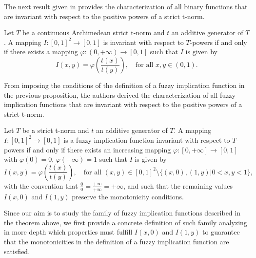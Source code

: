 The next result given in \cite{Massanet2019B} provides the characterization of all binary functions that are invariant with respect to the positive powers of a strict t-norm.
\begin{proposition}\label{prop:strict:charactbintpowerinv}
	Let $T$ be a continuous Archimedean strict t-norm and $t$ an additive generator of $T$. A mapping $I:[0,1]^2 \to [0,1]$ is invariant with respect to $T$-powers if and only if there exists a mapping $\varphi:(0,+\infty) \to [0,1]$ such that $I$ is given by
	$$I(x,y)=\varphi \left(\frac{t(x)}{t(y)}\right), \quad \text{for all } x,y \in (0,1).$$
\end{proposition}
From imposing the conditions of the definition of a fuzzy implication function in the previous proposition, the authors derived the characterization of all fuzzy implication functions that are invariant with respect to the positive powers of a strict t-norm.
\begin{theorem}\label{thm:strict:invimp}
	Let $T$ be a strict t-norm and $t$ an additive generator of $T$. A mapping $I:[0,1]^2 \to [0,1]$ is a fuzzy implication function invariant with respect to $T$-powers if and only if there exists an increasing mapping $\varphi:[0,+\infty] \to [0,1]$ with $\varphi(0)=0$, $\varphi(+\infty)=1$ such that $I$ is given by
	\begin{equation}
		I(x,y)=\varphi \left( \frac{t(x)}{t(y)} \right), \quad \text{for all } (x,y) \in [0,1]^2 \setminus \{(x,0),(1,y) \vert 0<x,y<1\},
		\label{eq:strict:invimpl}
	\end{equation}
	with the convention that $\frac{0}{0}=\frac{+\infty}{+\infty}=+\infty$, and such that the remaining values $I(x,0)$ and $I(1,y)$ preserve the monotonicity conditions.
\end{theorem}

Since our aim is to study the family of fuzzy implication functions described in the theorem above, we first provide a concrete definition of such family analyzing in more depth which properties must fulfill $I(x,0)$ and $I(1,y)$ to guarantee that the monotonicities in the definition of a fuzzy implication function are satisfied.

